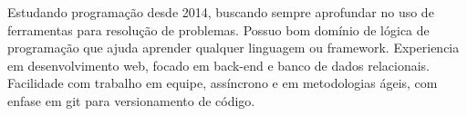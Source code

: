 \begin{cvletter}
  Estudando programação desde 2014, buscando sempre aprofundar no uso de ferramentas para resolução de problemas. Possuo bom domínio de lógica de programação que ajuda aprender qualquer linguagem ou framework. Experiencia em desenvolvimento web, focado em back-end e banco de dados relacionais. Facilidade com trabalho em equipe, assíncrono e em metodologias ágeis, com enfase em git para versionamento de código.

\end{cvletter}